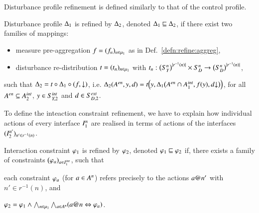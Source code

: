 \documentclass[runningheads]{llncs}
\makeatletter
\newenvironment{textlist}{\begin{enumerate*}[label=(\emph{\roman*})]}{\end{enumerate*}}
\newcommand{\defn}[1]{Def.~\ref{defn:#1}}
\newcommand{\ie}[1][\@ ]{i.e.{#1}}
\newcommand{\abstracts}[1][]{\sqsubseteq\ifx#1\relax\else^{#1}\fi}
\newcommand{\isrefinedby}{\abstracts}
\newcommand{\interface}[1][]{I\ifx#1\relax\else^{#1}\fi}
\newcommand{\map}[1][]{\mu\ifx#1\relax\else^{#1}\fi}
\newcommand{\action}[1][]{a\ifx#1\relax\else^{#1}\fi}
\newcommand{\actionat}[2]{#2@#1}
\newcommand{\actions}[1][]{A\ifx\relax#1\relax\else^{#1}\fi}
\newcommand{\measure}[1][]{y\ifx#1\relax\else^{#1}\fi}
\newcommand{\measurerange}[1][]{Y\ifx#1\relax\else^{#1}\fi}
\newcommand{\disturbance}[1][]{d\ifx#1\relax\else^{#1}\fi}
\newcommand{\disturbancerange}[1][]{D\ifx#1\relax\else^{#1}\fi}
\newcommand{\constraint}[1][]{\varphi\ifx#1\relax\else^{#1}\fi}
\newcommand{\distprofile}[1][]{\Delta\ifx#1\relax\else^{#1}\fi}
\newcommand{\project}[3][]{{#2}{\downarrow}\ifx#1\relax\else_{#3}\fi}
\newcommand{\vectorspace}[1][]{S\ifx#1\relax\else^{#1}\fi}
\newcommand{\external}[2][]{\ifx\relax#2\relax#1\mathit{ext}\else#2[#1\mathit{ext}]\fi}
\newcommand{\internal}[2][]{#2[#1\mathit{int}]}
\newcommand{\enabled}[2][]{{#2[\mathit{en}]\ifx#1\relax\else_{#1}\fi}}
\makeatother
\begin{document}
Disturbance profile refinement is defined similarly to that of the control profile.

\begin{definition}
  \label{defn:refine:distprofile}
  Disturbance profile $\distprofile_1$ is refined by $\distprofile_2$, denoted $\distprofile_1 \isrefinedby \distprofile_2$, if there exist two families of mappings:
%
  \begin{itemize}

  \item measure pre-aggregation $f = (f_n)_{n \in \map_1}$ as in \defn{refine:aggreg},%

  \item disturbance re-distribution $t = (t_n)_{n \in \map_1}$ with
    $
    t_n: \bigl(\vectorspace[n]_{\measurerange}\bigr)^{|r^{-1}(n)|} \times \vectorspace[n]_{\disturbancerange} \rightarrow \bigl(\vectorspace[n]_{\disturbancerange}\bigr)^{|r^{-1}(n)|}
    $,%
    
  \end{itemize}
%
  such that $\distprofile_2 = t \circ \distprofile_1 \circ (f, \project{}{\external{\vectorspace}_{\disturbancerange,1}})$, \ie
  $\distprofile_2(
      \enabled{\actions},
      \measure,
      \disturbance
      )
      =
      t\Big(
      \measure,
      \distprofile_1\bigl(
      \enabled{\actions} \cap \internal{\actions}_{1},
      f(\measure),
      \project{\disturbance}{\external{\vectorspace}_{\disturbancerange,1}}
      \bigr)
      \Big)$,
    for all $\enabled{\actions} \subseteq \internal{\actions}_{2}$, $\measure \in \internal{\vectorspace}_{\measurerange,2}$ and $\disturbance \in \external{\vectorspace}_{\disturbancerange,2}$.
\end{definition}

To define the inteaction constraint refinement, we have to explain how individual actions of every interface $\interface[n]_1$ are realised in terms of actions of the interfaces $(\interface[n']_2)_{n' \in r^{-1}(n)}$.

\begin{definition}
  \label{defn:refine:constraint}
  Interaction constraint $\constraint_1$ is refined by $\constraint_2$, denoted $\constraint_1 \isrefinedby \constraint_2$ if, there exists a family of constraints $\bigl(\constraint_{\action})_{\action \in \internal{\interface}_{1}}$, such that 
    \begin{textlist}
    \item
      each constraint $\constraint_{\action}$ (for $\action \in \actions[n]$) refers precisely to the actions $\actionat{n'}{\action}$ with $n' \in r^{-1}(n)$, and
    \item $\constraint_2 = \constraint_1 \land \bigwedge_{n \in \map_{1}} \bigwedge_{\action \in \actions[n]} (\actionat{n}{\action} \Leftrightarrow \constraint_{\action})$.
    \end{textlist}
\end{definition}
\end{document}
